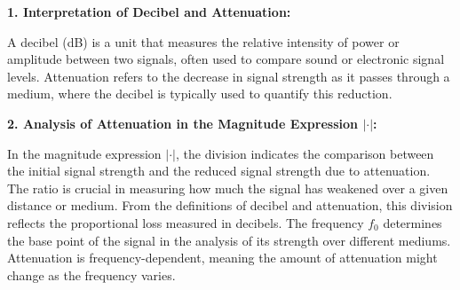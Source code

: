 \documentclass[10pt]{article}
\theoremstyle{definition}
\theoremstyle{remark}
\theoremstyle{definition}
\numberwithin{equation}{prob}
\begin{document}
\textbf{1. Interpretation of Decibel and Attenuation:}

A decibel (dB) is a unit that measures the relative intensity of power or amplitude between two signals, often used to compare sound or electronic signal levels. Attenuation refers to the decrease in signal strength as it passes through a medium, where the decibel is typically used to quantify this reduction.

\textbf{2. Analysis of Attenuation in the Magnitude Expression $| \cdot |$:}

In the magnitude expression $| \cdot |$, the division indicates the comparison between the initial signal strength and the reduced signal strength due to attenuation. The ratio is crucial in measuring how much the signal has weakened over a given distance or medium. From the definitions of decibel and attenuation, this division reflects the proportional loss measured in decibels. The frequency $f_0$ determines the base point of the signal in the analysis of its strength over different mediums. Attenuation is frequency-dependent, meaning the amount of attenuation might change as the frequency varies.
\end{document}
